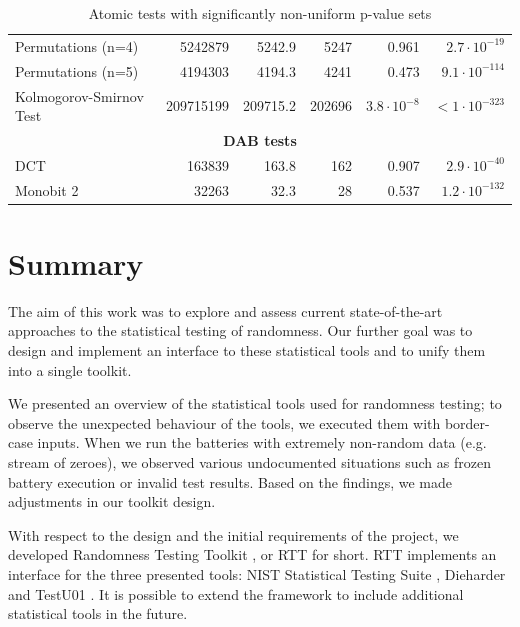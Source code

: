 \documentclass[
	digital,    %
	oneside,    %
	color,
	11pt,
	nocover,
	notable,
	nolof,
	nolot,
]{fithesis3}
\newcommand{\rd}{\cellcolor{red!40}}
\theoremstyle{definition}
\theoremstyle{remark}
\begin{document}
\begin{table}[H]
\begin{nomar}
{\begin{tabular}{@{}lrrrrr@{}}
Permutations (n=4)             & 5242879           & 5242.9        & 5247          & 0.961                  & $2.7 \cdot 10^{-19}$  \rd \\
Permutations (n=5)             & 4194303           & 4194.3        & 4241          & 0.473                  & $9.1 \cdot 10^{-114}$ \rd \\
Kolmogorov-Smirnov Test        & 209715199         & 209715.2      & 202696        & $3.8\cdot 10^{-8}$ \rd & $<1\cdot 10^{-323}$   \rd \\ \midrule
\multicolumn{6}{c}{\textbf{DAB tests}} \\ \midrule
DCT                            & 163839            & 163.8         & 162           & 0.907                  & $2.9 \cdot 10^{-40}$  \rd \\
Monobit 2                      & 32263             & 32.3          & 28            & 0.537                  & $1.2 \cdot 10^{-132}$ \rd \\ \bottomrule
\end{tabular}
}
\end{nomar}
\caption{Atomic tests with significantly non-uniform p-value sets}
\label{tab:non_uniform_atomic_tests}
\end{table}

\chapter{Summary}
\label{chap:summary}
The aim of this work was to explore and assess current state-of-the-art approaches to the statistical testing of randomness. Our further goal was to design and implement an interface to these statistical tools and to unify them into a single toolkit.

We presented an overview of the statistical tools used for randomness testing; to observe the unexpected behaviour of the tools, we executed them with border-case inputs. When we run the batteries with extremely non-random data (e.g. stream of zeroes), we observed various undocumented situations such as frozen battery execution or invalid test results. Based on the findings, we made adjustments in our toolkit design. 

With respect to the design and the initial requirements of the project, we developed Randomness Testing Toolkit \cite{rtt-github}, or RTT for short. RTT implements an interface for the three presented tools: NIST Statistical Testing Suite \cite{nist-sts}, Dieharder \cite{dieharder} and TestU01 \cite{testu01-paper}. It is possible to extend the framework to include additional statistical tools in the future.
\end{document}
